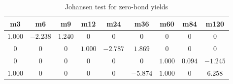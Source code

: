 \begin{table}[!htbp]
    \begin{center}
    \begin{tabular}{|ccccccccc|}
    \hline
    {m3}&{m6}&{m9}&{m12}&{m24}&{m36}&{m60}&{m84}&{m120}\tabularnewline
    \hline
    $1.000$&$-2.238$&$1.240$&$0$&$0$&$0$&$0$&$0$&$0$ \tabularnewline
    \hline
    $0$&$0$&$0$&$1.000$&$-2.787$&$1.869$&$0$&$0$&$0$ \tabularnewline
    \hline
    $0$&$0$&$0$&$0$&$0$&$0$&$1.000$&$0.094$&$-1.245$ \tabularnewline
    \hline
    $1.000$&$0$&$0$&$0$&$0$&$-5.874$&$1.000$&$0$&$6.258$ \tabularnewline
    \hline
    \end{tabular}\end{center}
    \caption{Johansen test for zero-bond yields}
    \label{tab:johansenTest}
    \end{table}